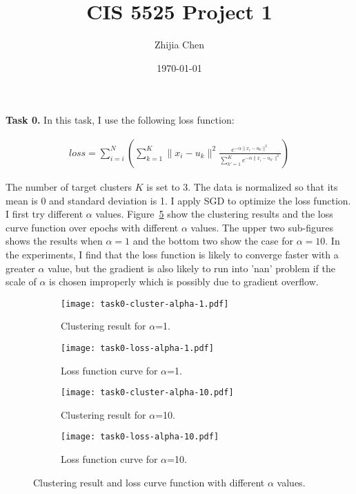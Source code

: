 \documentclass{article}
\title{CIS 5525 Project 1}
\author{Zhijia Chen}
\date{\today}
\begin{document}
\begin{titlepage}
    \maketitle
\end{titlepage}

\textbf{Task 0.}
\vspace{\baselineskip}
In this task, I use the following loss function:

\begin{align*}
    loss = \sum_{i=i}^{N}{\left(\sum_{k=1}^{K}\|x_i-u_k\|^2\frac{e^{-\alpha\|x_i-u_k\|^2}}{\sum_{k'=1}^{K}e^{-\alpha\|x_i-u_{k'}\|^2}}\right)}
\end{align*}

The number of target clusters $K$ is set to 3. The data is normalized so that its mean is 0 and standard deviation is 1. I apply SGD to optimize the loss function. I first try different $\alpha$ values. Figure~\ref{fig:task0} show the clustering results and the loss curve function over epochs with different $\alpha$ values. The upper two sub-figures shows the results when $\alpha=1$ and the bottom two show the case for $\alpha=10$. In the experiments, I find that the loss function is likely to converge faster with a greater $\alpha$ value, but the gradient is also likely to run into 'nan' problem if the scale of $\alpha$ is chosen improperly which is possibly due to gradient overflow.  
\begin{figure}[h!]
    \centering
    \begin{subfigure}{.33\textwidth}
      \centering
      \texttt{[image: task0-cluster-alpha-1.pdf]}
      \caption{Clustering result for $\alpha$=1.}
      \label{fig:cluster1}
    \end{subfigure}%
    \begin{subfigure}{.66\textwidth}
      \centering
      \texttt{[image: task0-loss-alpha-1.pdf]}
      \caption{Loss function curve for $\alpha$=1.}
      \label{fig:loss1}
    \end{subfigure}
    \centering
    \begin{subfigure}{.33\textwidth}
      \centering
      \texttt{[image: task0-cluster-alpha-10.pdf]}
      \caption{Clustering result for $\alpha$=10.}
      \label{fig:cluster10}
    \end{subfigure}%
    \begin{subfigure}{.66\textwidth}
      \centering
      \texttt{[image: task0-loss-alpha-10.pdf]}
      \caption{Loss function curve for $\alpha$=10.}
      \label{fig:loss10}
    \end{subfigure}
    \caption{Clustering result and loss curve function with different $\alpha$ values.}
    \label{fig:task0}
\end{figure}
\end{document}
